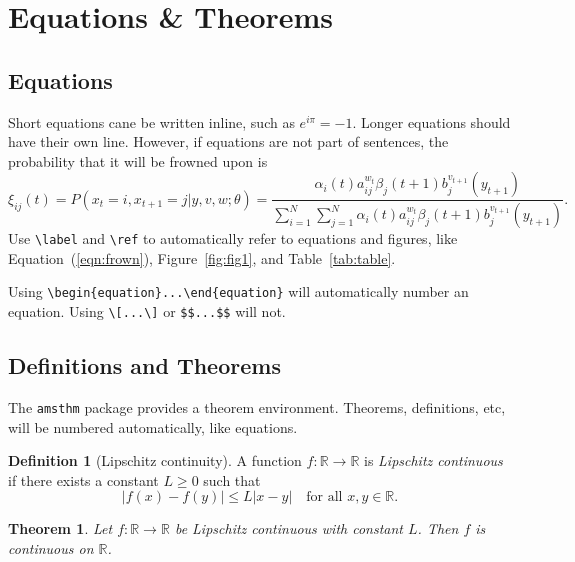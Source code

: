 \documentclass[12pt,a4paper]{article}
\newtheorem{theorem}{Theorem}
\theoremstyle{definition}
\newtheorem{definition}{Definition}
\begin{document}
\newpage %

\section{Equations \& Theorems}

\subsection{Equations}

Short equations cane be written inline, such as $e^{i\pi} = -1$. Longer equations should have their own line. However, if equations are not part of sentences, the probability that it will be frowned upon is
\begin{equation}\label{eqn:frown}
	\xi _{ij}(t)=P(x_{t}=i,x_{t+1}=j|y,v,w;\theta)= {\frac {\alpha _{i}(t)a^{w_t}_{ij}\beta _{j}(t+1)b^{v_{t+1}}_{j}(y_{t+1})}{\sum _{i=1}^{N} \sum _{j=1}^{N} \alpha _{i}(t)a^{w_t}_{ij}\beta _{j}(t+1)b^{v_{t+1}}_{j}(y_{t+1})}}.
\end{equation}
Use \verb+\label+ and \verb+\ref+ to automatically refer to equations and figures, like Equation~(\ref{eqn:frown}), Figure~\ref{fig:fig1}, and Table~\ref{tab:table}. %

Using \verb+\begin{equation}...\end{equation}+ will automatically number an equation. Using \verb+\[...\]+ or \verb+$$...$$+ will not.

\subsection{Definitions and Theorems}
The {\tt amsthm} package provides a theorem environment. Theorems, definitions, etc, will be numbered automatically, like equations.

\begin{definition}[Lipschitz continuity]
	A function $f:\mathbb{R}\to\mathbb{R}$ is \emph{Lipschitz continuous} if there exists a constant $L\ge 0$ such that
	\begin{equation}
	|f(x)-f(y)| \le L|x-y| \quad \text{for all } x,y\in\mathbb{R}.
	\end{equation}
\end{definition}

\begin{theorem}
	Let $f:\mathbb{R}\to\mathbb{R}$ be Lipschitz continuous with constant $L$. Then $f$ is continuous on $\mathbb{R}$.
\end{theorem}
\end{document}
